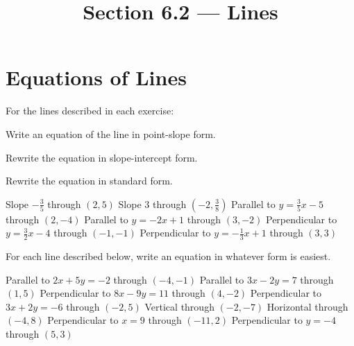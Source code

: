 

\title{Section 6.2 --- Lines}


\maketitle

\section*{Equations of Lines}
For the lines described in each exercise:
\begin{clist}
\item Write an equation of the line in point-slope form.
\item Rewrite the equation in slope-intercept form.
\item Rewrite the equation in standard form.
\end{clist}
\begin{smenum}
\mitemxx
{Slope $-\frac{3}{5}$ through $(2,5)$}
{Slope $3$ through $\left(-2,\frac{3}{8}\right)$}
\mitemxx
{Parallel to $y=\frac{3}{5}x-5$ through $(2,-4)$}
{Parallel to $y=-2x+1$ through $(3,-2)$}
\mitemxx
{Perpendicular to $y=\frac{3}{2}x-4$ through $(-1,-1)$}
{Perpendicular to $y=-\frac{1}{3}x+1$ through $(3,3)$}
\end{smenum}
For each line described below, write an equation in whatever form is easiest.
\begin{smenum}
\mitemxx
{Parallel to $2x+5y=-2$ through $(-4,-1)$}
{Parallel to $3x-2y=7$ through $(1,5)$}
\mitemxx
{Perpendicular to $8x-9y=11$ through $(4,-2)$}
{Perpendicular to $3x+2y=-6$ through $(-2,5)$}
\mitemxx
{Vertical through $(-2,-7)$}
{Horizontal through $(-4,8)$}
\mitemxx
{Perpendicular to $x=9$ through $(-11,2)$}
{Perpendicular to $y=-4$ through $(5,3)$}
\end{smenum}

